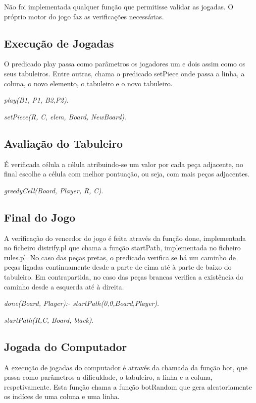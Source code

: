 \documentclass[a4paper]{article}
\begin{document}
Não foi implementada qualquer função que permitisse validar as jogadas. O próprio motor do jogo faz as verificações necessárias.

\subsection{Execução de Jogadas} 

O predicado play passa como parâmetros os jogadores um e dois assim como os seus tabuleiros. Entre outras, chama o predicado setPiece onde passa a linha, a coluna, o novo elemento, o tabuleiro e o novo tabuleiro.

\textit{play(B1, P1, B2,P2)}.

\textit{setPiece(R, C, elem, Board, NewBoard)}.

\subsection{Avaliação do Tabuleiro} 

É verificada célula a célula atribuindo-se um valor por cada peça adjacente, no final escolhe a célula com melhor pontuação, ou seja, com mais peças adjacentes.

\textit{greedyCell(Board, Player, R, C)}.


\subsection{Final do Jogo} 

A verificação do vencedor do jogo é feita através da função done, implementada no ficheiro distrify.pl que chama a função startPath, implementada no ficheiro rules.pl. No caso das peças pretas, o predicado verifica se há um caminho de peças ligadas continuamente desde a parte de cima até à parte de baixo do tabuleiro. Em contrapartida, no caso das peças brancas verifica a existência  do caminho desde a esquerda até à direita.

\textit{done(Board, Player):- startPath(0,0,Board,Player)}.

\textit{startPath(R,C, Board, black)}.

\subsection{Jogada do Computador} 

A execução de jogadas do computador é através da chamada da função bot, que passa como parâmetros  a dificuldade, o tabuleiro, a linha e a coluna, respetivamente. Esta função chama a função botRandom que gera aleatoriamente os indíces de uma coluna e uma linha.
\end{document}
